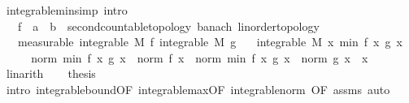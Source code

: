 \begin{isabellebody}
\endisatagproof
{\isafoldproof}%
%
\isadelimproof
\isanewline
%
\endisadelimproof
\isanewline
{}\isamarkupfalse%
\ integrable{\isacharunderscore}{\kern0pt}min{\isacharbrackleft}{\kern0pt}simp{\isacharcomma}{\kern0pt}\ intro{\isacharbrackright}{\kern0pt}{\isacharcolon}{\kern0pt}\isanewline
\ \ \ f\ {\isacharcolon}{\kern0pt}{\isacharcolon}{\kern0pt}\ {\isachardoublequoteopen}{\isacharprime}{\kern0pt}a\ {\isasymRightarrow}\ {\isacharprime}{\kern0pt}b\ {\isacharcolon}{\kern0pt}{\isacharcolon}{\kern0pt}\ {\isacharbraceleft}{\kern0pt}second{\isacharunderscore}{\kern0pt}countable{\isacharunderscore}{\kern0pt}topology{\isacharcomma}{\kern0pt}\ banach{\isacharcomma}{\kern0pt}\ linorder{\isacharunderscore}{\kern0pt}topology{\isacharbraceright}{\kern0pt}{\isachardoublequoteclose}\isanewline
\ \ \ {\isacharbrackleft}{\kern0pt}measurable{\isacharbrackright}{\kern0pt}{\isacharcolon}{\kern0pt}\ {\isachardoublequoteopen}integrable\ M\ f{\isachardoublequoteclose}\ {\isachardoublequoteopen}integrable\ M\ g{\isachardoublequoteclose}\isanewline
\ \ \ {\isachardoublequoteopen}integrable\ M\ {\isacharparenleft}{\kern0pt}{\isasymlambda}x{\isachardot}{\kern0pt}\ min\ {\isacharparenleft}{\kern0pt}f\ x{\isacharparenright}{\kern0pt}\ {\isacharparenleft}{\kern0pt}g\ x{\isacharparenright}{\kern0pt}{\isacharparenright}{\kern0pt}{\isachardoublequoteclose}\isanewline
%
\isadelimproof
%
\endisadelimproof
%
\isatagproof
{}\isamarkupfalse%
\ {\isacharminus}{\kern0pt}\isanewline
\ \ \isamarkupfalse%
\ {\isachardoublequoteopen}norm\ {\isacharparenleft}{\kern0pt}min\ {\isacharparenleft}{\kern0pt}f\ x{\isacharparenright}{\kern0pt}\ {\isacharparenleft}{\kern0pt}g\ x{\isacharparenright}{\kern0pt}{\isacharparenright}{\kern0pt}\ {\isasymle}\ norm\ {\isacharparenleft}{\kern0pt}f\ x{\isacharparenright}{\kern0pt}\ {\isasymor}\ norm\ {\isacharparenleft}{\kern0pt}min\ {\isacharparenleft}{\kern0pt}f\ x{\isacharparenright}{\kern0pt}\ {\isacharparenleft}{\kern0pt}g\ x{\isacharparenright}{\kern0pt}{\isacharparenright}{\kern0pt}\ {\isasymle}\ norm\ {\isacharparenleft}{\kern0pt}g\ x{\isacharparenright}{\kern0pt}{\isachardoublequoteclose}\ \ x\ \isamarkupfalse%
\ linarith\isanewline
\ \ \isamarkupfalse%
\ {\isacharquery}{\kern0pt}thesis\ \isamarkupfalse%
\ {\isacharparenleft}{\kern0pt}intro\ integrable{\isacharunderscore}{\kern0pt}bound{\isacharbrackleft}{\kern0pt}OF\ integrable{\isacharunderscore}{\kern0pt}max{\isacharbrackleft}{\kern0pt}OF\ integrable{\isacharunderscore}{\kern0pt}norm{\isacharparenleft}{\kern0pt}{}{\isacharcomma}{\kern0pt}{}{\isacharparenright}{\kern0pt}{\isacharcomma}{\kern0pt}\ OF\ assms{\isacharbrackright}{\kern0pt}{\isacharbrackright}{\kern0pt}{\isacharcomma}{\kern0pt}\ auto{\isacharparenright}{\kern0pt}\isanewline

\end{isabellebody}
